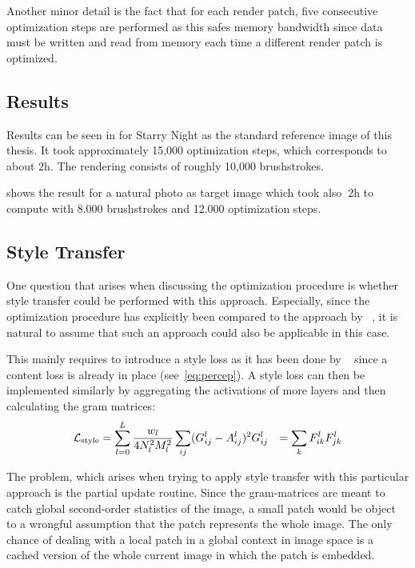 Another minor detail is the fact that for each render patch, five consecutive optimization steps are performed as this safes memory bandwidth since data must be written and read from memory each time a different render patch is optimized.

\subsection{Results}

Results can be seen in  for Starry Night as the standard reference image of this thesis.
It took approximately 15,000 optimization steps, which corresponds to about $2\si{\hour}$.
The rendering consists of roughly 10,000 brushstrokes.

 shows the result for a natural photo as target image which took
also $~2\si{\hour}$ to compute with 8.000 brushstrokes and 12.000 optimization steps.

\subsection{Style Transfer}

One question that arises when discussing the optimization procedure is whether style transfer could be performed with this approach.
Especially, since the optimization procedure has explicitly been compared to the approach by \citeauthor*{gatys}~\cite{gatys}, it is natural to assume that such an approach could also be applicable in this case.

This mainly requires to introduce a style loss as it has been done by \citeauthor*{gatys}~\cite{gatys} since a content loss is already in place (see~\eqref{eq:percep}).
A style loss can then be implemented similarly by aggregating the activations of more layers and then calculating the gram matrices:
\begin{align}
    \mathcal{L}_{\text{style}} & = \sum_{l=0}^L \frac{w_l}{4 N^2_l M^2_l} \sum_{ij} (G_{ij}^l - A_{ij}^l)^2
    G_{ij}^l & = \sum_k F_{ik}^l F_{jk}^l
\end{align}

The problem, which arises when trying to apply style transfer with this particular approach is the partial update routine.
Since the gram-matrices are meant to catch global second-order statistics of the image, a small patch would be object to a wrongful assumption that the patch represents the whole image.
The only chance of dealing with a local patch in a global context in image space is a cached version of the whole current image in which the patch is embedded.

